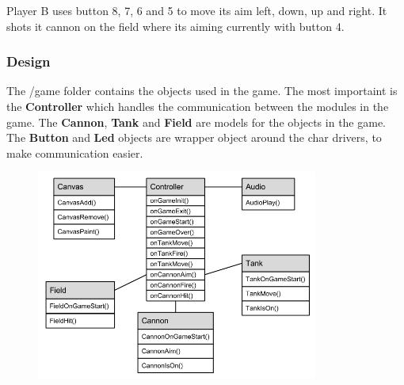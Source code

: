 Player B uses button 8, 7, 6 and 5 to move its aim left, down, up and right. It shots it cannon on
the field where its aiming currently with button 4.

\subsubsection{Design}

The /game folder contains the objects used in the game. The most importaint is the {\bf Controller}
which handles the communication between the modules in the game. The {\bf Cannon}, {\bf Tank} and
{\bf Field} are models for the objects in the game. The {\bf Button} and {\bf Led} objects are
wrapper object around the char drivers, to make communication easier.

\begin{figure}[h]
  \includegraphics[width=350px]{graphics/game_UML.png}
\end{figure}
